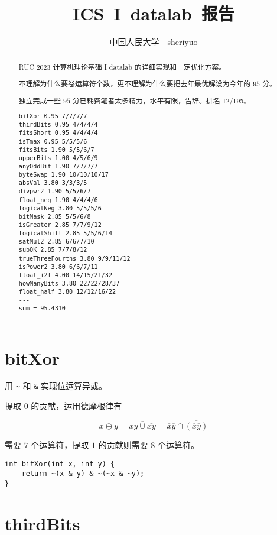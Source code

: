 \documentclass{noithesis}
\begin{document}
	
\title{ICS~I~datalab~报告}
	\author{中国人民大学~~sheriyuo}
	
	\maketitle
	
	\begin{abstract}
		RUC 2023 计算机理论基础 I datalab 的详细实现和一定优化方案。
		
		不理解为什么要卷运算符个数，更不理解为什么要把去年最优解设为今年的 $95$ 分。
		
		独立完成一些 $95$ 分已耗费笔者太多精力，水平有限，告辞。排名 12/195。
\begin{verbatim}
bitXor 0.95 7/7/7/7
thirdBits 0.95 4/4/4/4
fitsShort 0.95 4/4/4/4
isTmax 0.95 5/5/5/6
fitsBits 1.90 5/5/6/7
upperBits 1.00 4/5/6/9
anyOddBit 1.90 7/7/7/7
byteSwap 1.90 10/10/10/17
absVal 3.80 3/3/3/5
divpwr2 1.90 5/5/6/7
float_neg 1.90 4/4/4/6
logicalNeg 3.80 5/5/5/6
bitMask 2.85 5/5/6/8
isGreater 2.85 7/7/9/12
logicalShift 2.85 5/5/6/14
satMul2 2.85 6/6/7/10
subOK 2.85 7/7/8/12
trueThreeFourths 3.80 9/9/11/12
isPower2 3.80 6/6/7/11
float_i2f 4.00 14/15/21/32
howManyBits 3.80 22/22/28/37
float_half 3.80 12/12/16/22
---
sum = 95.4310
\end{verbatim}
	\end{abstract}
	
	\section{bitXor}
	
	用 \verb|~| 和 \verb|&| 实现位运算异或。
	
	提取 $0$ 的贡献，运用德摩根律有
	
	\begin{displaymath}
		x\oplus y = \overline{xy \cup \overline{xy}} = \overline x\overline y \cap \overline{(\overline x\overline y)}
	\end{displaymath}

	需要 $7$ 个运算符，提取 $1$ 的贡献则需要 $8$ 个运算符。
	
\begin{lstlisting}
int bitXor(int x, int y) {
	return ~(x & y) & ~(~x & ~y);
}
\end{lstlisting}

	\section{thirdBits}
	
\end{document}
